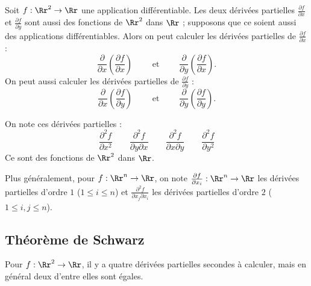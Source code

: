 \documentclass[11pt, class=report,crop=false]{standalone}
\begin{document}
Soit $f : \Rr^2 \to \Rr$ une application différentiable.
Les deux dérivées partielles $\frac{\partial f}{\partial x}$
et $\frac{\partial f}{\partial y}$ sont aussi des fonctions de $\Rr^2$ dans $\Rr$ ; 
supposons que ce soient aussi des applications différentiables.
Alors on peut calculer les dérivées partielles de $\frac{\partial f}{\partial x}$ :
$$\frac{\partial}{\partial x}\left(\frac{\partial f}{\partial x}\right)
\qquad \text{ et } \qquad 
\frac{\partial}{\partial y}\left(\frac{\partial f}{\partial x}\right).$$
On peut aussi calculer les dérivées partielles de $\frac{\partial f}{\partial y}$ :
$$\frac{\partial}{\partial x}\left(\frac{\partial f}{\partial y}\right)
\qquad \text{ et } \qquad 
\frac{\partial}{\partial y}\left(\frac{\partial f}{\partial y}\right).$$

On note ces dérivées partielles :
$$\frac{\partial ^2 f}{\partial x^2}
\qquad
\frac{\partial ^2 f}{\partial y\partial x}
\qquad
\frac{\partial ^2 f}{\partial x\partial y}
\qquad
\frac{\partial ^2 f}{\partial y^2}
$$
Ce sont des fonctions de $\Rr^2$ dans $\Rr$.


Plus généralement, pour $f : \Rr^n \to \Rr$, on note $\frac{\partial f}{\partial x_i} : \Rr^n \to \Rr$ les dérivées partielles d'ordre $1$ ($1 \le i \le n$)
et $\frac{\partial ^2f}{\partial x_j\partial x_i}$ les dérivées partielles d'ordre $2$ ($1 \le i,j \le n$).


\subsection{Théorème de Schwarz}


Pour $f : \Rr^2 \to \Rr$, il y a quatre dérivées partielles secondes à calculer, mais en général deux d'entre elles sont égales.
\end{document}

